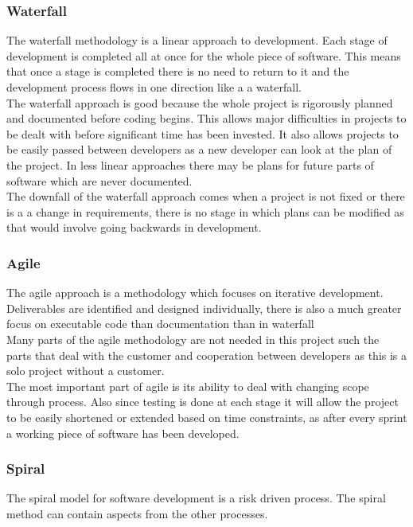 \documentclass{article}
\begin{document}
\subsubsection{Waterfall}
The waterfall methodology is a linear approach to development. Each stage of development is completed all at once for the whole piece of software. This means that once a stage is completed there is no need to return to it and the development process flows in one direction like a a waterfall.\\

The waterfall approach is good because the whole project is rigorously planned and documented before coding begins. This allows major difficulties in projects to be dealt with before significant time has been invested. It also allows projects to be easily passed between developers as a new developer can look at the plan of the project. In less linear approaches there may be plans for future parts of software which are never documented.\\

The downfall of the waterfall approach comes when a project is not fixed or there is a a change in requirements, there is no stage in which plans can be modified as that would involve going backwards in development.\\


\subsubsection{Agile}
The agile approach is a methodology which focuses on iterative development. Deliverables are identified and designed individually, there is also a much greater focus on executable code than documentation than in waterfall\\

Many parts of the agile methodology are not needed in this project such the parts that deal with the customer and cooperation between developers as this is a solo project without a customer.\\

The most important part of agile is its ability to deal with changing scope through process. Also since testing is done at each stage it will allow the project to be easily shortened or extended based on time constraints, as after every sprint a working piece of software has been developed.\\

\subsubsection{Spiral}
The spiral model for software development is a risk driven process. The spiral method can contain aspects from the other processes.\\
\end{document}
